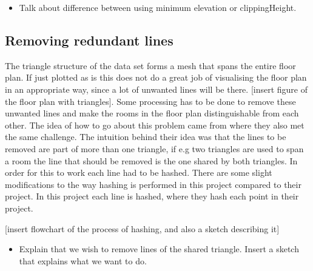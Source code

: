 \begin{itemize}
    \item Talk about difference between using minimum elevation or clippingHeight.
\end{itemize}


\subsection{Removing redundant lines}
The triangle structure of the data set forms a mesh that spans the entire floor plan. If just plotted as is this does not do a great job of visualising the floor plan in an appropriate way, since a lot of unwanted lines will be there. [insert figure of the floor plan with triangles]. Some processing has to be done to remove these unwanted lines and make the rooms in the floor plan distinguishable from each other. The idea of how to go about this problem came from \cite{wayfinding} where they also met the same challenge. The intuition behind their idea was that the lines to be removed are part of more than one triangle, if e.g two triangles are used to span a room the line that should be removed is the one shared by both triangles. In order for this to work each line had to be hashed. There are some slight modifications to the way hashing is performed in this project compared to their project. In this project each line is hashed, where they hash each point in their project.

[insert flowchart of the process of hashing, and also a sketch describing it]

\begin{itemize}
    \item Explain that we wish to remove lines of the shared triangle. Insert a sketch that explains what we want to do.
\end{itemize}



